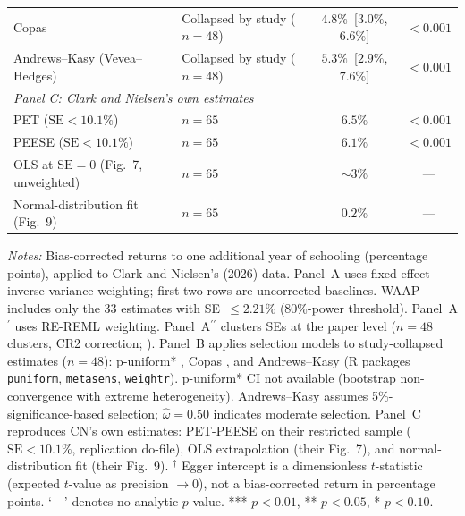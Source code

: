 \begin{table}[htbp]
\begin{tabular}{llcc}
  Copas                        & Collapsed by study ($n=48$) & $4.8\%$~[$3.0\%$, $6.6\%$] & $<0.001$ \\
  Andrews--Kasy (Vevea--Hedges) & Collapsed by study ($n=48$) & $5.3\%$~[$2.9\%$, $7.6\%$] & $<0.001$ \\
\midrule
\multicolumn{4}{l}{\textit{Panel C: Clark and Nielsen's own estimates}} \\
  PET ($\mathrm{SE}<10.1\%$)            & $n=65$ & $6.5\%$ & $<0.001$ \\
  PEESE ($\mathrm{SE}<10.1\%$)          & $n=65$ & $6.1\%$ & $<0.001$ \\
  OLS at $\mathrm{SE}=0$ (Fig.\ 7, unweighted) & $n=65$ & $\sim 3\%$ & --- \\
  Normal-distribution fit (Fig.\ 9)             & $n=65$ & $0.2\%$    & --- \\
\bottomrule
\end{tabular}

\vspace{0.5em}
\begin{minipage}{0.95\linewidth}
\footnotesize \textit{Notes:} Bias-corrected returns to one additional year of schooling (percentage points), applied to Clark and Nielsen's (2026) data. Panel~A uses fixed-effect inverse-variance weighting; first two rows are uncorrected baselines. WAAP includes only the 33 estimates with SE~$\leq 2.21\%$ (80\%-power threshold). Panel~A$^\prime$ uses RE-REML weighting. Panel~A$^{\prime\prime}$ clusters SEs at the paper level ($n=48$ clusters, CR2 correction; \citealt{Hedges2010}). Panel~B applies selection models to study-collapsed estimates ($n=48$): p-uniform* \citep{vanAert2021}, Copas \citep{Copas2001}, and Andrews--Kasy \citep{AndrewsKasy2019} (R packages \texttt{puniform}, \texttt{metasens}, \texttt{weightr}). p-uniform* CI not available (bootstrap non-convergence with extreme heterogeneity). Andrews--Kasy assumes 5\%-significance-based selection; $\hat{\omega} = 0.50$ indicates moderate selection. Panel~C reproduces CN's own estimates: PET-PEESE on their restricted sample ($\mathrm{SE}<10.1\%$, replication do-file), OLS extrapolation (their Fig.~7), and normal-distribution fit (their Fig.~9). $^{\dag}$ Egger intercept is a dimensionless $t$-statistic (expected $t$-value as precision $\to 0$), not a bias-corrected return in percentage points. `---' denotes no analytic $p$-value. *** $p<0.01$, ** $p<0.05$, * $p<0.10$.
\end{minipage}
\end{table}
